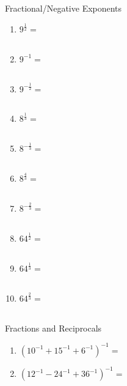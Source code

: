 \documentclass{article}
\begin{document}
\newpage
	\centerline{\Large{ Fractional/Negative Exponents}}\vspace{12 pt}
\begin{enumerate}
\item $ 9^{\frac{1}{2}} = $ \\ \\
\item $ 9^{-1} = $ \\ \\
\item $ 9^{-\frac{1}{2}} = $ \\ \\
\item $ 8^{\frac{1}{3}} =$ \\ \\
\item $ 8^{-\frac{1}{3}} =$ \\ \\
\item $ 8^{\frac{4}{3}} =$ \\ \\
\item $ 8^{-\frac{2}{3}} =$ \\ \\
\item $ 64^{\frac{1}{2}} =$ \\ \\
\item $ 64^{\frac{1}{3}} =$ \\ \\
\item $ 64^{\frac{2}{3}} =$ \\ \\
\end{enumerate}

	\centerline{\Large{ Fractions and Reciprocals}}\vspace{12 pt}
\begin{enumerate}
\item $ \left( 10^{-1}+15^{-1}+6^{-1} \right)^{-1} =$ \vspace{60pt} \\
\item $ \left( 12^{-1} - 24^{-1} + 36^{-1} \right)^{-1} =$ \vspace{60pt} \\

\end{enumerate}
\end{document}
